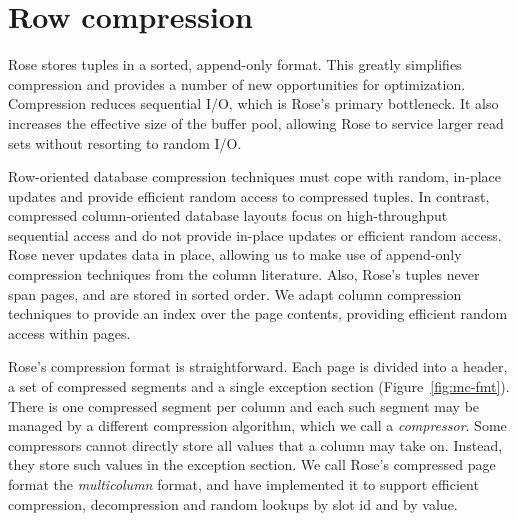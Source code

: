 \documentclass{vldb}
\newcommand{\rows}{Rose\xspace}
\newcommand{\rowss}{Rose's\xspace}
\begin{document}

\section{Row compression}

\rows stores tuples in a sorted, append-only format.  This greatly
simplifies compression and provides a number of new opportunities for
optimization.  Compression reduces sequential I/O, which is \rowss primary bottleneck.
It also
increases the effective size of the buffer pool, allowing \rows to
service larger read sets without resorting to random I/O.

Row-oriented database compression techniques must cope with random,
in-place updates and provide efficient random access to compressed
tuples.  In contrast, compressed column-oriented database layouts
focus on high-throughput sequential access and do not provide in-place
updates or efficient random access.  \rows never updates data in
place, allowing us to make use of append-only compression techniques
from the column literature.  Also, \rowss tuples never span pages, and
are stored in sorted order.  We adapt column compression techniques to provide an
index over the page contents, providing efficient random access within
pages.

\rowss compression format is straightforward.  Each page is divided into
a header, a set of compressed segments and a single exception section
(Figure~\ref{fig:mc-fmt}).  There is one compressed segment per column
and each such segment may be managed by a different compression
algorithm, which we call a {\em compressor}.  Some compressors cannot
directly store all values that a column may take on.  Instead, they
store such values in the exception section.  We call
\rowss compressed page format the {\em multicolumn} format, and have
implemented it to support efficient compression,
decompression and random lookups by slot id and by value.
\end{document}
